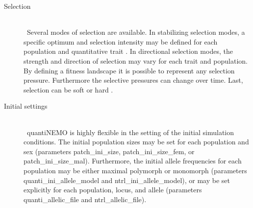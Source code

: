 \documentclass[letterpaper,12pt,oneside]{book}
\begin{document}
\begin{description}
\item[Selection]\hspace*{\fill}\\\
Several modes of selection are available. In stabilizing selection modes, a specific optimum and selection intensity may be defined for each population and quantitative trait \citep{Burger_2000}. In directional selection modes, the strength and direction of selection may vary for each trait and population. By defining a fitness landscape it is possible to represent any selection pressure. Furthermore the selective pressures can change over time. Last, selection can be soft or hard \citep{Wallace_1968}.

\item[Initial settings]\hspace*{\fill}\\\
quantiNEMO is highly flexible in the setting of the initial simulation conditions. The initial population sizes may be set for each population and sex (parameters \textsf{patch\_ini\_size}, \textsf{patch\_ini\_size\_fem}, or \textsf{patch\_ini\_size\_mal}). Furthermore, the initial allele frequencies for each population may be either maximal polymorph or monomorph (parameters \textsf{quanti\_ini\_allele\_model} and \textsf{ntrl\_ini\_allele\_model}), or may be set explicitly for each population, locus, and allele (parameters \textsf{quanti\_allelic\_file} and \textsf{ntrl\_allelic\_file}). 
\end{description}
\end{document}
